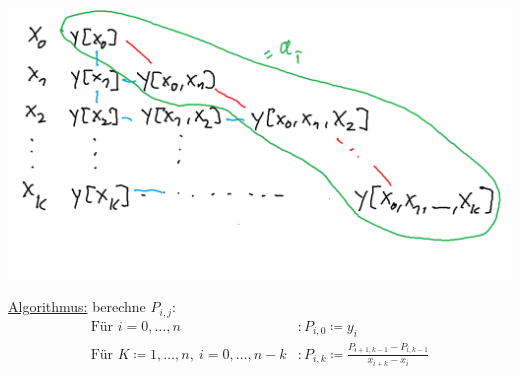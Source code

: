 \documentclass[../Skript.tex]{subfiles}
\begin{document}
\begin{question}
    \begin{center}
        \includegraphics[width=\linewidth]{Bilder/071122_1.png}\\
    \end{center}
\underline{Algorithmus:} berechne $P_{i,j}$:\begin{align*}
    \text{Für }i=0,\dots,n&: P_{i,0} \coloneqq y_i\\
    \text{Für }K\coloneqq 1,\dots,n, \ i=0,\dots,n-k&: P_{i,k} \coloneqq \frac{P_{i+1, k-1}-P_{i,k-1}}{x_{i+k}-x_i}
\end{align*}
\end{question}
\end{document}
